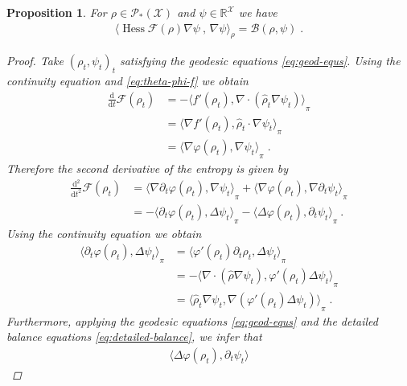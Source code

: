 \documentclass[a4paper,11pt,reqno]{amsart}
\theoremstyle{plain}
\newtheorem{proposition}[theorem]{Proposition}
\theoremstyle{remark}
\numberwithin{equation}{section}
\begin{document}
\begin{proposition}\label{prop:Hessian}
For $\rho \in {{\mathscr{P}}_*({\mathcal{X}})}$ and $\psi \in {{\mathbb R}}^{\mathcal{X}}$ we have 
\begin{align*}
{\big\langle {{ \operatorname{Hess} {\mathcal{F}}(\rho) \nabla \psi\ ,\, \nabla \psi}}\big\rangle}_\rho
    = {\mathcal{B}}(\rho,\psi)\;.
\end{align*}

\begin{proof}
  Take $(\rho_t , \psi_t)_t$ satisfying the geodesic equations
  \eqref{eq:geod-equs}.
Using the continuity equation and \eqref{eq:theta-phi-f} we obtain
\begin{align*}
 {\frac{\mathrm{d}}{\mathrm{d}t}} {\mathcal{F}}(\rho_t)
    &=  - {\big\langle {{ f'(\rho_t), \nabla\cdot( \hat\rho_t \nabla \psi_t) }}\big\rangle}_\pi  \\&  =  {\big\langle {{ \nabla f'(\rho_t) ,  \hat\rho_t \cdot \nabla \psi_t }}\big\rangle}_\pi
  \\&  =  {\big\langle {{ \nabla {\varphi}(\rho_t) ,  \nabla \psi_t }}\big\rangle}_\pi\;.
\end{align*}
Therefore the second derivative of the entropy is given by
\begin{align*}
  {\frac{\mathrm{d^2}}{\mathrm{d}t^2}} {\mathcal{F}}(\rho_t)
    & =  {\big\langle {{ \nabla \partial_t {\varphi}(\rho_t) ,  \nabla \psi_t }}\big\rangle}_\pi
        + {\big\langle {{ \nabla {\varphi}(\rho_t) ,  \nabla \partial_t \psi_t }}\big\rangle}_\pi 
   \\&  = -  {\big\langle {{  \partial_t {\varphi}(\rho_t) ,  \Delta \psi_t }}\big\rangle}_\pi
         -  {\big\langle {{ \Delta  {\varphi}(\rho_t) ,  \partial_t \psi_t }}\big\rangle}_\pi \ .
\end{align*}
Using the continuity equation we obtain
\begin{align*}
  {\big\langle {{  \partial_t {\varphi}(\rho_t) ,  \Delta \psi_t }}\big\rangle}_\pi
   & =   {\big\langle {{   {\varphi}'(\rho_t) \partial_t \rho_t,  \Delta \psi_t }}\big\rangle}_\pi
 \\& = - {\big\langle {{   \nabla\cdot( \hat\rho \nabla \psi_t) , {\varphi}'(\rho_t) \Delta \psi_t }}\big\rangle}_\pi
 \\& =   {\big\langle {{ \hat\rho_t \nabla \psi_t ,  \nabla({\varphi}'(\rho_t) \Delta \psi_t ) }}\big\rangle}_\pi\;.
\end{align*}
Furthermore, applying the geodesic equations \eqref{eq:geod-equs} and
the detailed balance equations \eqref{eq:detailed-balance}, we infer
that
\begin{align*}
 {\big\langle {{ \Delta {\varphi}(\rho_t) ,  \partial_t \psi_t }}\big\rangle}
 

\end{align*}
\end{proof}
\end{proposition}
\end{document}
